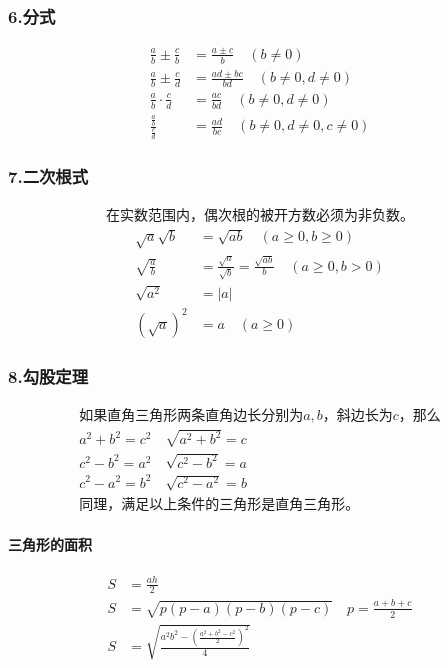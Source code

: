 \documentclass{ctexart}
\begin{document}
\subsubsection*{6.分式}
\begin{align*}
\frac{a}{b}\pm\frac{c}{b}&=\frac{a \pm c}{b}\quad(b\neq0) \\
\frac{a}{b}\pm\frac{c}{d}&=\frac{ad \pm bc}{bd}\quad(b\neq0,d\neq0) \\
\frac{a}{b}\cdot\frac{c}{d}&=\frac{ac}{bd}\quad(b\neq0,d\neq0) \\
\frac{\frac{a}{b}}{\frac{c}{d}}&=\frac{ad}{bc}\quad(b\neq0,d\neq0,c\neq0)
\end{align*}
\subsubsection*{7.二次根式}
\begin{gather*}
\text{在实数范围内，偶次根的被开方数必须为非负数。}
\end{gather*}
\begin{align*}
\sqrt{a}\sqrt{b}&=\sqrt{ab}\quad(a\ge0,b\ge0) \\
\sqrt{\frac{a}{b}}&=\frac{\sqrt{a}}{\sqrt{b}}=\frac{\sqrt{ab}}{b}\quad(a\ge0,b>0) \\
\sqrt{a^2}&=|a| \\
(\sqrt{a})^2&=a\quad(a\ge0)
\end{align*}
\subsubsection*{8.勾股定理}
\begin{gather*}
\text{如果直角三角形两条直角边长分别为$a, b$，斜边长为$c$，那么} \\
a^2+b^2=c^2\quad\sqrt{a^2+b^2}=c \\
c^2-b^2=a^2\quad\sqrt{c^2-b^2}=a \\
c^2-a^2=b^2\quad\sqrt{c^2-a^2}=b \\
\text{同理，满足以上条件的三角形是直角三角形。}
\end{gather*}
\paragraph{三角形的面积}
\begin{align*}
S&=\frac{ah}{2} \\
S&=\sqrt{p(p-a)(p-b)(p-c)}\quad p=\frac{a+b+c}{2} \\
S&=\sqrt{\frac{a^2b^2-(\frac{a^2+b^2-c^2}{2})^2}{4}}
\end{align*}
\end{document}
